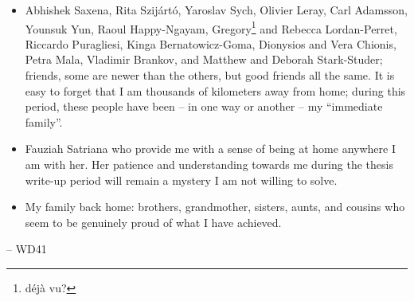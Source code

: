\begin{itemize}
	\item Abhishek Saxena, Rita Szijártó, Yaroslav Sych, Olivier Leray, Carl Adamsson, Younsuk Yun, Raoul Happy-Ngayam, Gregory\footnote{déjà vu?} and Rebecca Lordan-Perret, Riccardo Puragliesi, Kinga Bernatowicz-Goma, Dionysios and Vera Chionis, Petra Mala, Vladimir Brankov, and Matthew and Deborah Stark-Studer; friends, some are newer than the others, but good friends all the same.
  It is easy to forget that I am thousands of kilometers away from home; during this period, these people have been -- in one way or another -- my ``immediate family''.
  \item Fauziah Satriana who provide me with a sense of being at home anywhere I am with her. Her patience and understanding towards me during the thesis write-up period will remain a mystery I am not willing to solve.
  \item My family back home: brothers, grandmother, sisters, aunts, and cousins who seem to be genuinely proud of what I have achieved.
\end{itemize}

\bigskip
\hspace*{0mm}-- WD41

